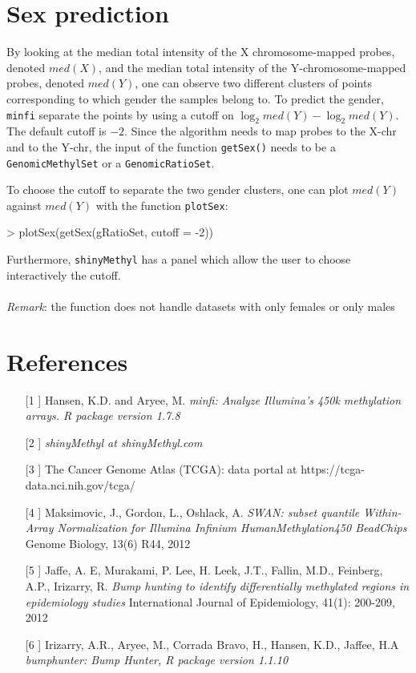 \documentclass[12pt]{article}
\begin{document}
\section{Sex prediction}

By looking at the median total intensity of the X chromosome-mapped probes, denoted $med(X)$, and the median total intensity of the Y-chromosome-mapped probes, denoted $med(Y)$, one can observe two different clusters of points corresponding to which gender the samples belong to. To predict the gender, \texttt{minfi} separate the points by using a cutoff on $\log_2{med(Y)}-\log_2{med(Y)}$. The default cutoff is $-2$.  Since the algorithm needs to map probes to the X-chr and to the Y-chr, the input of the function \texttt{getSex()} needs to be a \texttt{GenomicMethylSet} or a \texttt{GenomicRatioSet}. 
\begin{Schunk}
\end{Schunk}
To choose the cutoff to separate the two gender clusters, one can plot $med(Y)$ against $med(Y)$ with the function \texttt{plotSex}:
\begin{Schunk}
\begin{Sinput}
> plotSex(getSex(gRatioSet, cutoff = -2))
\end{Sinput}
\end{Schunk}
Furthermore, \texttt{shinyMethyl} has a panel which allow the user to choose interactively the cutoff. 
\\
\\
\textit{Remark}: the function does not handle datasets with only females or only males



\section*{References}
\begin{itemize}
\item[[1]] Hansen, K.D. and Aryee, M.
\emph{minfi: Analyze Illumina's 450k methylation arrays. R package version 1.7.8}
\item[[2]] \emph{shinyMethyl at shinyMethyl.com}
\item[[3]] The Cancer Genome Atlas (TCGA): data portal at https://tcga-data.nci.nih.gov/tcga/
\item[[4]] Maksimovic, J., Gordon, L., Oshlack, A.
\emph{SWAN: subset quantile Within-Array Normalization for Illumina Infinium HumanMethylation450 BeadChips}
Genome Biology, 13(6) R44, 2012
\item[[5]] Jaffe, A. E, Murakami, P. Lee, H. Leek, J.T., Fallin, M.D., Feinberg, A.P., Irizarry, R. 
\emph{Bump hunting to identify differentially methylated regions in epidemiology studies}
International Journal of Epidemiology, 41(1): 200-209, 2012
\item[[6]] Irizarry, A.R., Aryee, M., Corrada Bravo, H., Hansen, K.D., Jaffee, H.A
\emph{bumphunter: Bump Hunter, R package version 1.1.10}
\end{itemize}
\end{document}
